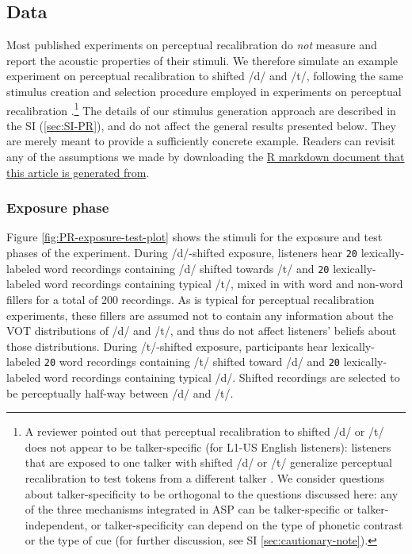 \documentclass[
  11pt,
  man,floatsintext]{apa6}
\begin{document}
\subsection{Data}\label{data}

Most published experiments on perceptual recalibration do \emph{not} measure and report the acoustic properties of their stimuli. We therefore simulate an example experiment on perceptual recalibration to shifted /d/ and /t/, following the same stimulus creation and selection procedure employed in experiments on perceptual recalibration \autocite[e.g.,][]{kraljic-samuel2006}.\footnote{A reviewer pointed out that perceptual recalibration to shifted /d/ or /t/ does not appear to be talker-specific (for L1-US English listeners): listeners that are exposed to one talker with shifted /d/ or /t/ generalize perceptual recalibration to test tokens from a different talker \autocite[unlike for shifted /s/ or //, e.g.,][]{kraljic-samuel2007}. We consider questions about talker-specificity to be orthogonal to the questions discussed here: any of the three mechanisms integrated in ASP can be talker-specific or talker-independent, or talker-specificity can depend on the type of phonetic contrast or the type of cue (for further discussion, see SI \ref{sec:cautionary-note}).} The details of our stimulus generation approach are described in the SI (\ref{sec:SI-PR}), and do not affect the general results presented below. They are merely meant to provide a sufficiently concrete example. Readers can revisit any of the assumptions we made by downloading the \href{https://osf.io/q7gjp/}{R markdown document that this article is generated from}.

\subsubsection{Exposure phase}\label{exposure-phase}

Figure \ref{fig:PR-exposure-test-plot} shows the stimuli for the exposure and test phases of the experiment. During /d/-shifted exposure, listeners hear \texttt{20} lexically-labeled word recordings containing /d/ shifted towards /t/ and \texttt{20} lexically-labeled word recordings containing typical /t/, mixed in with word and non-word fillers for a total of 200 recordings. As is typical for perceptual recalibration experiments, these fillers are assumed not to contain any information about the VOT distributions of /d/ and /t/, and thus do not affect listeners' beliefs about those distributions. During /t/-shifted exposure, participants hear lexically-labeled \texttt{20} word recordings containing /t/ shifted toward /d/ and \texttt{20} lexically-labeled word recordings containing typical /d/. Shifted recordings are selected to be perceptually half-way between /d/ and /t/.
\end{document}
